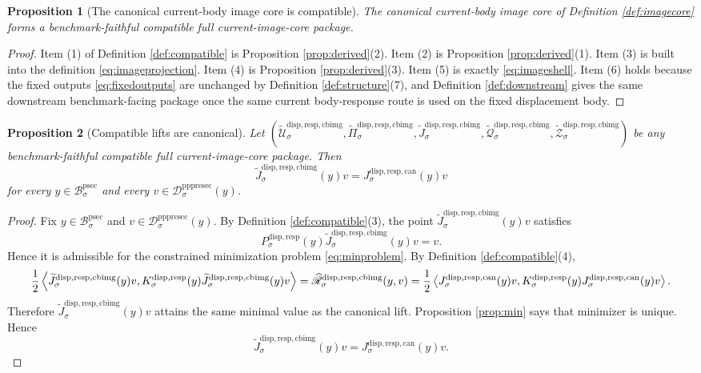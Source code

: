 \documentclass[11pt]{article}
\newcommand{\ProtoSectionBody}[1]{\mathcal B_{#1}^{\mathrm{psec}}}
\newcommand{\PrePreProtoSectionResidualBody}[1]{\mathcal D_{#1}^{\mathrm{pppresec}}}
\newcommand{\SubstrateProjection}[1]{P_{#1}^{\mathrm{disp,resp}}}
\newcommand{\SubstrateOperator}[1]{K_{#1}^{\mathrm{disp,resp}}}
\newcommand{\CanonicalLift}[1]{J_{#1}^{\mathrm{disp,resp,can}}}
\newcommand{\CoreForcedBodyResponse}[1]{\widehat{\mathscr R}_{#1}^{\mathrm{disp,resp,cbimg}}}
\newcommand{\CompatibleImageBody}[1]{\widetilde{\mathcal U}_{#1}^{\mathrm{disp,resp,cbimg}}}
\newcommand{\CompatibleImageProjection}[1]{\widetilde{\Pi}_{#1}^{\mathrm{disp,resp,cbimg}}}
\newcommand{\CompatibleImageLift}[1]{\widetilde J_{#1}^{\mathrm{disp,resp,cbimg}}}
\newcommand{\CompatibleImageResponseLaw}[1]{\widetilde{\mathscr Q}_{#1}^{\mathrm{disp,resp,cbimg}}}
\newcommand{\CompatibleImageShell}[1]{\widetilde{\mathcal Z}_{#1}^{\mathrm{disp,resp,cbimg}}}
\newtheorem{proposition}{Proposition}
\begin{document}
\begin{proposition}[The canonical current-body image core is compatible]
\label{prop:exists}
The canonical current-body image core of Definition \ref{def:imagecore} forms a benchmark-faithful compatible full current-image-core package.
\end{proposition}

\begin{proof}
Item (1) of Definition \ref{def:compatible} is Proposition \ref{prop:derived}(2). Item (2) is Proposition \ref{prop:derived}(1). Item (3) is built into the definition \eqref{eq:imageprojection}. Item (4) is Proposition \ref{prop:derived}(3). Item (5) is exactly \eqref{eq:imageshell}. Item (6) holds because the fixed outputs \eqref{eq:fixedoutputs} are unchanged by Definition \ref{def:structure}(7), and Definition \ref{def:downstream} gives the same downstream benchmark-facing package once the same current body-response route is used on the fixed displacement body.
\end{proof}

\begin{proposition}[Compatible lifts are canonical]
\label{prop:lift}
Let \((\CompatibleImageBody{\sigma},\CompatibleImageProjection{\sigma},\CompatibleImageLift{\sigma},\CompatibleImageResponseLaw{\sigma},\CompatibleImageShell{\sigma})\) be any benchmark-faithful compatible full current-image-core package. Then
\[
\CompatibleImageLift{\sigma}(y)v
=
\CanonicalLift{\sigma}(y)v
\]
for every \(y\in\ProtoSectionBody{\sigma}\) and every \(v\in\PrePreProtoSectionResidualBody{\sigma}(y)\).
\end{proposition}

\begin{proof}
Fix \(y\in\ProtoSectionBody{\sigma}\) and \(v\in\PrePreProtoSectionResidualBody{\sigma}(y)\). By Definition \ref{def:compatible}(3), the point \(\CompatibleImageLift{\sigma}(y)v\) satisfies
\[
\SubstrateProjection{\sigma}(y)\CompatibleImageLift{\sigma}(y)v=v.
\]
Hence it is admissible for the constrained minimization problem \eqref{eq:minproblem}. By Definition \ref{def:compatible}(4),
\[
\frac{1}{2}
\ev{
\CompatibleImageLift{\sigma}(y)v,
\SubstrateOperator{\sigma}(y)\CompatibleImageLift{\sigma}(y)v
}
=
\CoreForcedBodyResponse{\sigma}(y,v)
=
\frac{1}{2}
\ev{
\CanonicalLift{\sigma}(y)v,
\SubstrateOperator{\sigma}(y)\CanonicalLift{\sigma}(y)v
}.
\]
Therefore \(\CompatibleImageLift{\sigma}(y)v\) attains the same minimal value as the canonical lift. Proposition \ref{prop:min} says that minimizer is unique. Hence
\[
\CompatibleImageLift{\sigma}(y)v
=
\CanonicalLift{\sigma}(y)v.
\]
\end{proof}
\end{document}
